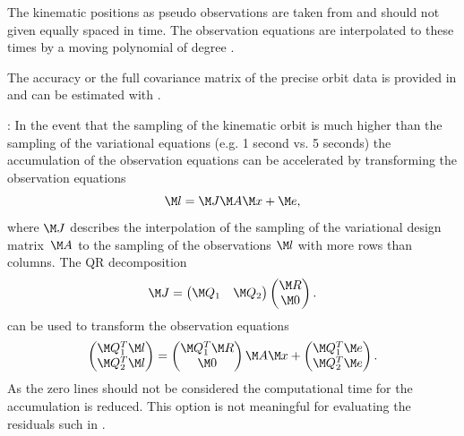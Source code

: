 The kinematic positions as pseudo observations are taken from
 and should not given equally spaced in time. The observation
equations are interpolated to these times by a moving polynomial of degree .

The accuracy or the full covariance matrix of the precise orbit data is provided in
 and can be estimated with .

: In the event that the sampling of the kinematic orbit is much higher than the sampling
of the variational equations (e.g. 1 second vs. 5 seconds) the accumulation of the observation equations
can be accelerated by transforming the observation equations
\begin{equation}
  \M l = \M J \M A \M x + \M e,
\end{equation}
where $\M J$ describes the interpolation of the sampling of the variational design matrix~$\M A$
to the sampling of the observations $\M l$ with more rows than columns. The QR decomposition
\begin{equation}
  \M J = \begin{pmatrix} \M Q_1 & \M Q_2 \end{pmatrix}
         \begin{pmatrix} \M R \\ \M 0 \end{pmatrix}.
\end{equation}
can be used to transform the observation equations
\begin{equation}
  \begin{pmatrix} \M Q_1^T \M l \\ \M Q_2^T \M l \end{pmatrix} =
  \begin{pmatrix} \M Q_1^T \M R \\ \M 0 \end{pmatrix} \M A \M x +
  \begin{pmatrix} \M Q_1^T \M e \\ \M Q_2^T \M e \end{pmatrix}.
\end{equation}
As the zero lines should not be considered the computational time for the accumulation is reduced.
This option is not meaningful for evaluating the residuals such in .

